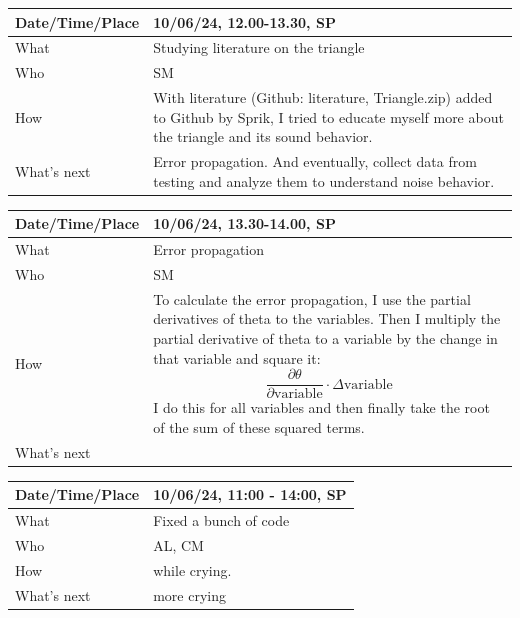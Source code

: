 \documentclass{article}
\begin{document}
\begin{table}[H]
\begin{tabular}{|p{1.5in}|p{4in}|}
\hline
Date/Time/Place &  10/06/24, 12.00-13.30, SP\\ \hline
What            &  Studying literature on the triangle \\ \hline
Who             &  SM\\ \hline
How             &  With literature (Github: literature, Triangle.zip) added to Github by Sprik, I tried to educate myself more about the triangle and its sound behavior.\\ \hline
What's next     &   Error propagation. And eventually, collect data from testing and analyze them to understand noise behavior.\\ \hline
\end{tabular}
\end{table}

\begin{table}[H]
\begin{tabular}{|p{1.5in}|p{4in}|}
\hline
Date/Time/Place &  10/06/24, 13.30-14.00, SP\\ \hline
What            &  Error propagation\\ \hline
Who             &  SM\\ \hline
How             &   To calculate the error propagation, I use the partial derivatives of theta to the variables. Then I multiply the partial derivative of theta to a variable by the change in that variable and square it: $$\frac{\partial\theta}{\partial \text{variable}}\cdot\Delta\text{variable}$$ I do this for all variables and then finally take the root of the sum of these squared terms.\\ \hline
What's next     &  \\ \hline
\end{tabular}
\end{table}

\begin{table}[H]
\begin{tabular}{|p{1.5in}|p{4in}|}
\hline
Date/Time/Place &  10/06/24, 11:00 - 14:00, SP\\ \hline
What            &  Fixed a bunch of code\\ \hline
Who             &  AL, CM\\ \hline
How             &  while crying.\\ \hline
What's next     &  more crying\\ \hline
\end{tabular}
\end{table}
\end{document}
